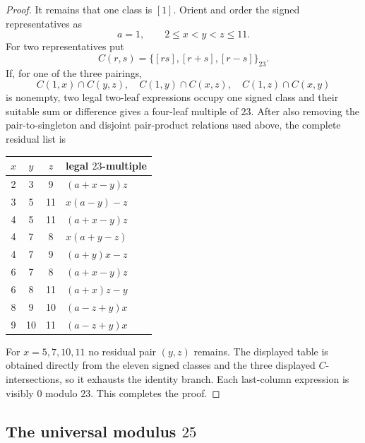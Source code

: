 \begin{proof}
It remains that one class is $[1]$.  Orient and order the signed
representatives as
\[
 a=1,
 \qquad 2\le x<y<z\le11.
\]
For two representatives put
\[
 C(r,s)=\{[rs],[r+s],[r-s]\}_{23}.
\]
If, for one of the three pairings,
\[
 C(1,x)\cap C(y,z),\quad C(1,y)\cap C(x,z),\quad
 C(1,z)\cap C(x,y)
\]
is nonempty, two legal two-leaf expressions occupy one signed class and their
suitable sum or difference gives a four-leaf multiple of $23$.  After also removing the pair-to-singleton and disjoint pair-product
relations used above, the complete residual list is
\small
\begin{center}
\begin{tabular}{@{}cccl@{}}
\toprule
$x$ & $y$ & $z$ & legal $23$-multiple \\
\midrule
2&3&9&$(a+x-y)z$\\
3&5&11&$x(a-y)-z$\\
4&5&11&$(a+x-y)z$\\
4&7&8&$x(a+y-z)$\\
4&7&9&$(a+y)x-z$\\
6&7&8&$(a+x-y)z$\\
6&8&11&$(a+x)z-y$\\
8&9&10&$(a-z+y)x$\\
9&10&11&$(a-z+y)x$\\
\bottomrule
\end{tabular}
\end{center}
\normalsize
For $x=5,7,10,11$ no residual pair $(y,z)$ remains.  The displayed table is
obtained directly from the eleven signed classes and the three displayed
$C$-intersections, so it exhausts the identity branch.  Each last-column
expression is visibly $0$ modulo $23$.  This completes the proof.
\end{proof}

\subsection{\texorpdfstring{The universal modulus $25$}{The universal modulus 25}}\label{app:p25}

